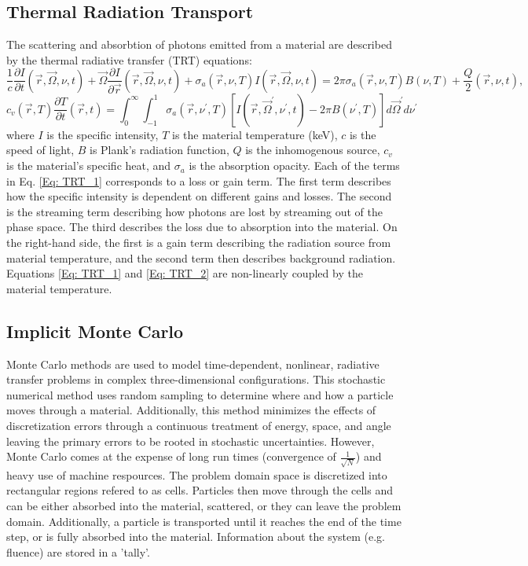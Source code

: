 \documentclass[]{article}
\begin{document}
	\subsection{Thermal Radiation Transport}
		The scattering and absorbtion of photons emitted from a material are described by the thermal radiative transfer (TRT) equations: 
		\begin{equation} \label{Eq: TRT_1}
		\frac{1}{c} \frac{\partial I}{\partial t}(\vec{r}, \vec{\Omega}, \nu, t) + \vec{\Omega} \frac{\partial I}{\partial \vec{r}}(\vec{r}, \vec{\Omega}, \nu, t) + \sigma_{a}(\vec{r}, \nu, T)I(\vec{r}, \vec{\Omega}, \nu, t) = 2 \pi \sigma_{a}(\vec{r}, \nu, T)B(\nu, T) + \frac{Q}{2}(\vec{r}, \nu, t),
		\end{equation}
		\begin{equation} \label{Eq: TRT_2}
		c_{v}(\vec{r}, T) \frac{\partial T}{\partial t}(\vec{r},t) = \int_{0}^{\infty} \int_{-1}^{1} \sigma_{a}(\vec{r}, \nu^{\prime}, T)[I(\vec{r}, \vec{\Omega}^{\prime}, \nu^{\prime}, t) - 2 \pi B(\nu^{\prime}, T)] d \vec{\Omega}^{\prime} d \nu^{\prime}
		\end{equation}
		where $I$ is the specific intensity, $T$ is the material temperature (keV), $c$ is the speed of light, $B$ is Plank's radiation function, $Q$ is the inhomogenous source, $c_{v}$ is the material's specific heat, and $\sigma_{a}$ is the absorption opacity. Each of the terms in Eq. \ref{Eq: TRT_1} corresponds to a loss or gain term. The first term describes how the specific intensity is dependent on different gains and losses. The second is the streaming term describing how photons are lost by streaming out of the phase space. The third describes the loss due to absorption into the material. On the right-hand side, the first is a gain term describing the radiation source from material temperature, and the second term then describes background radiation. Equations \ref{Eq: TRT_1} and \ref{Eq: TRT_2} are non-linearly coupled by the material temperature. 

	\subsection{Implicit Monte Carlo}
		Monte Carlo methods are used to model time-dependent, nonlinear, radiative transfer problems in complex three-dimensional configurations. This stochastic numerical method uses random sampling to determine where and how a particle moves through a material. Additionally, this method minimizes the effects of discretization errors through a continuous treatment of energy, space, and angle leaving the primary errors to be rooted in stochastic uncertainties. However, Monte Carlo comes at the expense of long run times (convergence of $\frac{1}{\sqrt{N}}$) and heavy use of machine respources. The problem domain space is discretized into rectangular regions refered to as cells. Particles then move through the cells and can be either absorbed into the material, scattered, or they can leave the problem domain. Additionally, a particle is transported until it reaches the end of the time step, or is fully absorbed into the material. Information about the system (e.g. fluence) are stored in a 'tally'.
				
\end{document}
